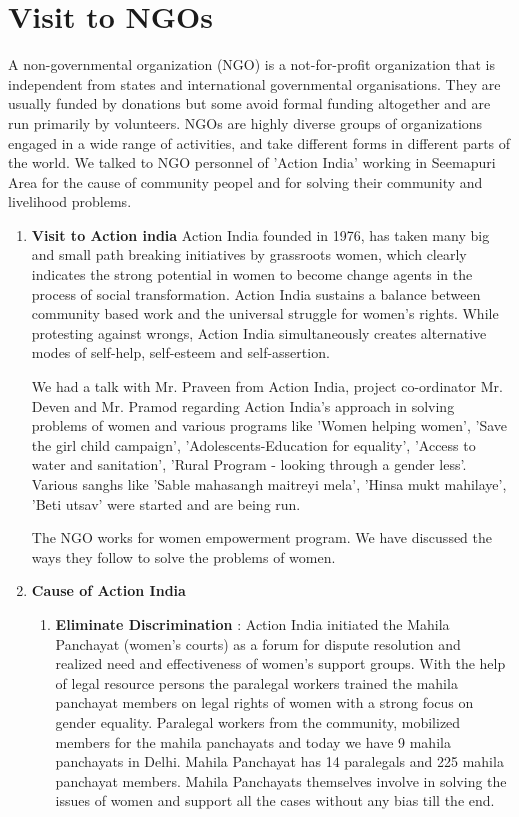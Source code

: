 \section{Visit to NGOs}
A non-governmental organization (NGO) is a not-for-profit organization that is independent from states and international governmental organisations. They are usually funded by donations but some avoid formal funding altogether and are run primarily by volunteers. NGOs are highly diverse groups of organizations engaged in a wide range of activities, and take different forms in different parts of the world. We talked to NGO personnel of 'Action India' working in Seemapuri Area for the cause of community peopel and for solving their  community and livelihood problems. 
\begin{enumerate}
\item \textbf {Visit to Action india}
Action India founded in 1976, has taken many big and small path breaking initiatives by grassroots women, which clearly indicates the strong potential in women to become change agents in the process of social transformation. Action India sustains a balance between community based work and the universal struggle for women’s rights. While protesting against wrongs, Action India simultaneously creates alternative modes of self-help, self-esteem and self-assertion.

We had a talk with Mr. Praveen from Action India, project co-ordinator Mr. Deven
and Mr. Pramod regarding Action India's approach in solving problems of women
and various programs like 'Women helping women', 'Save the girl child campaign', 'Adolescents-Education for equality', 'Access to water and sanitation', 'Rural Program - looking through a gender less'. Various sanghs like 'Sable mahasangh maitreyi mela', 'Hinsa mukt mahilaye', 'Beti utsav' were started and are being run.

The NGO works for women empowerment program. We have discussed the ways they follow to solve the problems of women.

 \item \textbf{Cause of Action India}
\begin{enumerate} 
 \item   \textbf{Eliminate Discrimination} : Action India initiated the Mahila Panchayat (women’s courts) as a forum for
dispute resolution and realized need and effectiveness of women’s support groups. With the help of legal resource persons the paralegal workers trained the mahila panchayat members on legal rights of women with a strong focus on gender equality. Paralegal workers from the community, mobilized members for the mahila panchayats and today we have 9 mahila panchayats in Delhi. Mahila Panchayat has 14 paralegals and 225 mahila panchayat members. Mahila Panchayats themselves involve in solving the issues of women and support all the cases without any bias till the end.


\end{enumerate}
\end{enumerate}
